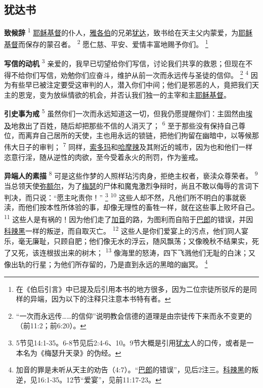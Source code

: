 \setlength\columnsep{0.6cm}
\begin{multicols}{2}

\chapter*{犹达书}


\textbf{致候辞\quad}
\textsuperscript{1}
\uline{耶稣}\uline{基督}的仆人，\uline{雅各伯}的兄弟\uline{犹达}，致书给在天主父内蒙爱，为\uline{耶稣}\uline{基督}而保存的蒙召者。
\textsuperscript{2}
愿仁慈、平安、爱情丰富地赐予你们。
\renewcommand\thefootnote{\ding{\numexpr171+\value{footnote}}}
\footnote{在《伯后引言》中已提及后引用本书的地方很多，因为二位宗徒所驳斥的是同样的异端，因为以下的注释只注意本书特有者。}

\textbf{写信的动机\quad}
\textsuperscript{3}
亲爱的，我早已切望给你们写信，讨论我们共享的救恩；但现在不得不给你们写信，劝勉你们应奋斗，维护从前一次而永远传与圣徒的信仰。
\footnote{“一次而永远传……的信仰”说明教会信德的道理是由宗徒传下来而永不变更的（前11:2；前6:20）。}
\textsuperscript{4}
因为有些早已被注定要受这审判的人，潜入你们中间；他们是邪恶的人，竟把我们天主的恩宠，变为放纵情欲的机会，并否认我们独一的主宰和主\uline{耶稣}\uline{基督}。

\textbf{引史事为戒\quad}
\textsuperscript{5}
虽然你们一次而永远知道这一切，但我仍愿提醒你们：主固然由\uline{埃及}地救出了百姓，随后却把那些不信的人消灭了；
\textsuperscript{6}
至于那些没有保持自己尊位，而离弃自己居所的天使，主也用永远的锁链，把他们拘留在幽暗中，以等候那伟大日子的审判；
\textsuperscript{7}
同样，\uline{索多玛}和\uline{哈摩辣}及其附近的城市，因为也和他们一样恣意行淫，随从逆性的肉欲，至今受着永火的刑罚，作为鉴戒。

\textbf{异端人的素描\quad}
\textsuperscript{8}
可是这些作梦的人照样玷污肉身，拒绝主权者，亵渎众尊荣者。
\textsuperscript{9}
当总领天使\uline{弥额尔}，为了\uline{梅瑟}的尸体和魔鬼激烈争辩时，尚且不敢以侮辱的言词下判决，而只说：“愿主叱责你！”
\footnote{5节见14:1-35。6-8节见后2:4-6、10。9节大概是引用\uline{犹太}人的口传，或者是一本名为《梅瑟升天录》的伪经。}
\textsuperscript{10}
这些人却不然，凡他们所不明白的事就亵渎，而他们按本性所体验的事，却像无理性的畜牲一样，就在这些事上败坏自己。
\textsuperscript{11}
这些人是有祸的！因为他们走了\uline{加音}的路，为图利而自陷于\uline{巴郎}的错误，并因\uline{科辣黑}一样的叛逆，而自取灭亡。
\textsuperscript{12}
这些人是你们爱宴上的污点，他们同人宴乐，毫无廉耻，只顾自肥；他们像无水的浮云，随风飘荡；又像晚秋不结果实，死了又死，该连根拔出来的树木；
\textsuperscript{13}
像海里的怒涛，四下飞溅他们无耻的白沫；又像出轨的行星；为他们所存留的，乃是直到永远的黑暗的幽冥。
\footnote{加音的罪是未听从天主的劝告（4:7）。“\uline{巴郎}的错误”，见后2注三。\uline{科辣黑}的叛逆，见16:1-35。12节“爱宴”，见前11:17-23。}


\end{multicols}
